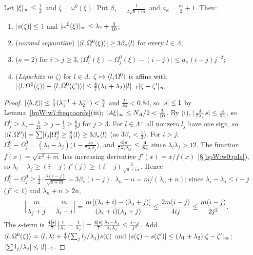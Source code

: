 
\begin{lemma}\label{bpW:w7:unpert-bounds}
Let $\lvert \xi\rvert_\infty\le\frac12$ and $\zeta=\omega^0(\xi)$. Put $\beta_*=\frac{1}{2\sqrt{9+m}}$ and $a_\kappa=\frac m2+1$. Then:
\begin{enumerate}[label=(\roman*)]
\item $\lvert s(\zeta)\rvert\le1$ and $\lvert \omega^0(\xi)\rvert_\infty\le\lambda_2+\frac3{10}$;
\item (\emph{normal separation}) $\lvert \langle l,\Omega^0(\xi)\rangle\rvert\ge3\beta_*\langle l\rangle$ for every $l\in\Lambda$;
\item (\emph{$\kappa=2$}) for $i>j\ge3$, $\bigl|\Omega^0_i(\xi)-\Omega^0_j(\xi)-(i-j)\bigr|\le a_\kappa(i-j)j^{-2}$;
\item (\emph{Lipschitz in $\zeta$}) for $l\in\Lambda$, $\zeta\mapsto\langle l,\Omega^0\rangle$ is affine with
  $\lvert \langle l,\Omega^0(\zeta)\rangle-\langle l,\Omega^0(\zeta')\rangle\rvert\le\frac47(\lambda_1+\lambda_2)\lvert l\rvert_{-1}\lvert \zeta-\zeta'\rvert_\infty$.
\end{enumerate}
\end{lemma}
\begin{proof}
\label{stepW:w7:ssize}
$\lvert \langle b,\xi\rangle\rvert\le\frac12(\lambda_1^{-1}+\lambda_2^{-1})<\frac34$ and $\frac{21}{8\pi}<0.84$, so $\lvert s\rvert\le1$ by
Lemma~\ref{bpW:w7:freqcoords}(iii); $\lvert A\xi\rvert_\infty\le N_A/2<\frac3{10}$.
\label{stepW:w7:plus}
By (i), $\lvert \frac4{7\lambda_j}s\rvert\le\frac4{21}$, so $\Omega^0_j\ge\lambda_j-\frac4{21}\ge j-\frac13\ge\frac89j$ for
$j\ge3$. For $l\in\Lambda^+$ all nonzero $l_j$ have one sign, so
$\lvert \langle l,\Omega^0\rangle\rvert=\sum\lvert l_j\rvert\Omega^0_j\ge\frac89\langle l\rangle\ge3\beta_*\langle l\rangle$ (as $3\beta_*<\frac12$).
\label{stepW:w7:minus}
For $i>j$: $\Omega^0_i-\Omega^0_j=(\lambda_i-\lambda_j)\bigl(1-\frac{4s}{7\lambda_i\lambda_j}\bigr)$, and
$\frac{4\lvert s\rvert}{7\lambda_i\lambda_j}\le\frac4{84}$ since $\lambda_i\lambda_j>12$. The function $f(x)=\sqrt{x^2+m}$ has
increasing derivative $f'(x)=x/f(x)$ (\S\ref{bpW:w0:pde}), so $\lambda_i-\lambda_j\ge(i-j)f'(j)\ge(i-j)\frac3{\sqrt{9+m}}$.
Hence $\Omega^0_i-\Omega^0_j\ge\frac12\cdot\frac{3(i-j)}{\sqrt{9+m}}=3\beta_*(i-j)$.
\label{stepW:w7:kappa}
$\lambda_n-n=m/(\lambda_n+n)$; since $\lambda_i-\lambda_j\le i-j$ ($f'<1$) and $\lambda_n+n>2n$,
\[\Bigl|\frac m{\lambda_j+j}-\frac m{\lambda_i+i}\Bigr|=\frac{m\,[(\lambda_i+i)-(\lambda_j+j)]}{(\lambda_i+i)(\lambda_j+j)}
\le\frac{2m(i-j)}{4ij}\le\frac{m(i-j)}{2j^2}.\]
The $s$-term is $\frac{4\lvert s\rvert}7\bigl|\frac1{\lambda_i}-\frac1{\lambda_j}\bigr|=\frac{4\lvert s\rvert}7\frac{\lambda_i-\lambda_j}{\lambda_i\lambda_j}
\le\frac{i-j}{j^2}$. Add.
\label{stepW:w7:liplOmega}
$\langle l,\Omega^0(\zeta)\rangle=\langle l,\lambda\rangle+\frac47\bigl(\sum_jl_j/\lambda_j\bigr)s(\zeta)$ and
$\lvert s(\zeta)-s(\zeta')\rvert\le(\lambda_1+\lambda_2)\lvert \zeta-\zeta'\rvert_\infty$; $\lvert \sum l_j/\lambda_j\rvert\le\lvert l\rvert_{-1}$.
\end{proof}
